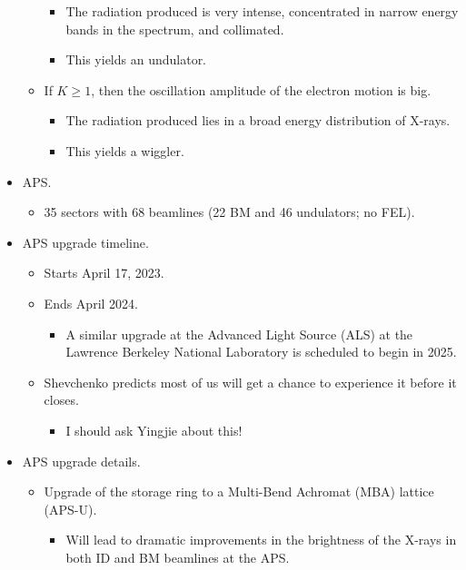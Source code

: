 \documentclass[../notes.tex]{subfiles}
\begin{document}
\begin{itemize}
\begin{itemize}
        \begin{itemize}
            \item The radiation produced is very intense, concentrated in narrow energy bands in the spectrum, and collimated.
            \item This yields an undulator.
        \end{itemize}
        \item If $K\geq 1$, then the oscillation amplitude of the electron motion is big.
        \begin{itemize}
            \item The radiation produced lies in a broad energy distribution of X-rays.
            \item This yields a wiggler.
        \end{itemize}
    \end{itemize}
    \item APS.
    \begin{itemize}
        \item 35 sectors with 68 beamlines (22 BM and 46 undulators; no FEL).
    \end{itemize}
    \item APS upgrade timeline.
    \begin{itemize}
        \item Starts April 17, 2023.
        \item Ends April 2024.
        \begin{itemize}
            \item A similar upgrade at the Advanced Light Source (ALS) at the Lawrence Berkeley National Laboratory is scheduled to begin in 2025.
        \end{itemize}
        \item Shevchenko predicts most of us will get a chance to experience it before it closes.
        \begin{itemize}
            \item I should ask Yingjie about this!
        \end{itemize}
    \end{itemize}
    \item APS upgrade details.
    \begin{itemize}
        \item Upgrade of the storage ring to a Multi-Bend Achromat (MBA) lattice (APS-U).
        \begin{itemize}
            \item Will lead to dramatic improvements in the brightness of the X-rays in both ID and BM beamlines at the APS.

\end{itemize}
\end{itemize}
\end{itemize}
\end{document}
